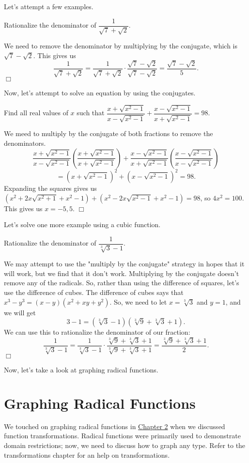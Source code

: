 \documentclass[lang=en,11pt]{elegantbook}
\begin{document}
Let's attempt a few examples.
\begin{example}
Rationalize the denominator of $\dfrac{1}{\sqrt{7}+\sqrt{2}}$.
\end{example}
\begin{solution}
We need to remove the denominator by multiplying by the conjugate, which is $\sqrt{7}-\sqrt{2}$. This gives us $$\dfrac{1}{\sqrt{7}+\sqrt{2}}=\dfrac{1}{\sqrt{7}+\sqrt{2}}\cdot\dfrac{\sqrt{7}-\sqrt{2}}{\sqrt{7}-\sqrt{2}}=\dfrac{\sqrt{7}-\sqrt{2}}{5}.$$ $\Box$
\end{solution}
Now, let's attempt to solve an equation by using the conjugates.
\begin{example}
Find all real values of $x$ such that $\dfrac{x+\sqrt{x^2-1}}{x-\sqrt{x^2-1}}+\dfrac{x-\sqrt{x^2-1}}{x+\sqrt{x^2-1}}=98.$
\end{example}
\begin{solution}
We meed to multiply by the conjugate of both fractions to remove the denominators. $$\dfrac{x+\sqrt{x^2-1}}{x-\sqrt{x^2-1}}\left(\dfrac{x+\sqrt{x^2-1}}{x+\sqrt{x^2-1}}\right)+\dfrac{x-\sqrt{x^2-1}}{x+\sqrt{x^2-1}}\left(\dfrac{x-\sqrt{x^2-1}}{x-\sqrt{x^2-1}}\right)$$$$=(x+\sqrt{x^2-1})^2+(x-\sqrt{x^2-1})^2=98.$$
Expanding the squares gives us $(x^2+2x\sqrt{x^2+1}+x^2-1)+(x^2-2x\sqrt{x^2-1}+x^2-1)=98$, so $4x^2=100$. This gives us $x=-5,5$. $\Box$
\end{solution}
Let's solve one more example using a cubic function.
\begin{example}
Rationalize the denominator of $\dfrac{1}{\sqrt[3]{3}-1}$.
\end{example}
\begin{solution}
We may attempt to use the "multiply by the conjugate" strategy in hopes that it will work, but we find that it don't work.  Multiplying by the conjugate doesn't remove any of the radicals.  So, rather than using the difference of squares, let's use the difference of cubes.  The difference of cubes says that $x^3-y^3=(x-y)(x^2+xy+y^2)$.  So, we need to let $x=\sqrt[3]{3}$ and $y=1$, and we will get $$3-1=(\sqrt[3]{3}-1)(\sqrt[3]{9}+\sqrt[3]{3}+1).$$ We can use this to rationalize the denominator of our fraction: $$\dfrac{1}{\sqrt[3]{3}-1}=\dfrac{1}{\sqrt[3]{3}-1}\cdot\dfrac{\sqrt[3]{9}+\sqrt[3]{3}+1}{\sqrt[3]{9}+\sqrt[3]{3}+1}=\dfrac{\sqrt[3]{9}+\sqrt[3]{3}+1}{2}.$$ $\Box$
\end{solution}
\noindent Now, let's take a look at graphing radical functions.
\section{Graphing Radical Functions}
\noindent We touched on graphing radical functions in \hyperlink{chapter.2}{Chapter 2} when we discussed function transformations.  Radical functions were primarily used to demonstrate domain restrictions; now, we need to discuss how to graph any type.  Refer to the transformations chapter for an help on transformations.
\end{document}
